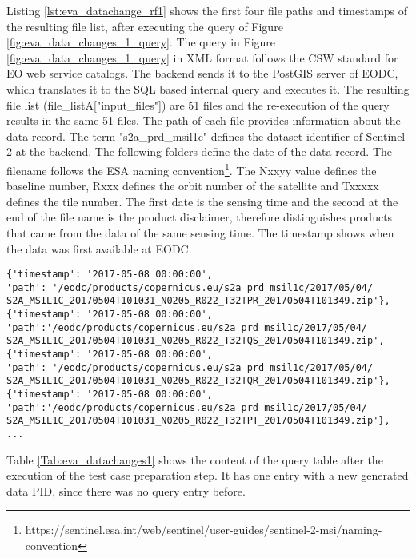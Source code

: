 \documentclass[draft,final]{vutinfth} %
\newenvironment{code}{\captionsetup{type=listing}}{}
\newcommand{\bgoesswein}[1]{{\color{blue}#1}}
\begin{document}
\begin{enumerate}
	Listing \ref{lst:eva_datachange_rf1} shows the first four file paths and timestamps of the resulting file list, after executing the query of Figure \ref{fig:eva_data_changes_1_query}. \bgoesswein{The query in Figure \ref{fig:eva_data_changes_1_query} in XML format follows the CSW standard for EO web service catalogs. The backend sends it to the PostGIS server of EODC, which translates it to the SQL based internal query and executes it.} The resulting file list (file\_listA["input\_files"]) are 51 files and the re-execution of the query results in the same 51 files. The path of each file provides information about the data record. The term "s2a\_prd\_msil1c" defines the dataset identifier of Sentinel 2 at the backend. The following folders define the date of the data record. The filename follows the ESA naming convention\footnote{https://sentinel.esa.int/web/sentinel/user-guides/sentinel-2-msi/naming-convention}. The Nxxyy value defines the baseline number, Rxxx defines the orbit number of the satellite and Txxxxx defines the tile number. The first date is the sensing time and the second at the end of the file name is the product disclaimer, therefore distinguishes products that came from the data of the same sensing time. The timestamp shows when the data was first available at EODC.
	\newpage
	\begin{code}
		\begin{verbatim}
{'timestamp': '2017-05-08 00:00:00', 
'path': '/eodc/products/copernicus.eu/s2a_prd_msil1c/2017/05/04/
S2A_MSIL1C_20170504T101031_N0205_R022_T32TPR_20170504T101349.zip'}, 
{'timestamp': '2017-05-08 00:00:00',
'path':'/eodc/products/copernicus.eu/s2a_prd_msil1c/2017/05/04/
S2A_MSIL1C_20170504T101031_N0205_R022_T32TQS_20170504T101349.zip', 
{'timestamp': '2017-05-08 00:00:00', 
'path': '/eodc/products/copernicus.eu/s2a_prd_msil1c/2017/05/04/
S2A_MSIL1C_20170504T101031_N0205_R022_T32TQR_20170504T101349.zip'}, 
{'timestamp': '2017-05-08 00:00:00',
'path':'/eodc/products/copernicus.eu/s2a_prd_msil1c/2017/05/04/
S2A_MSIL1C_20170504T101031_N0205_R022_T32TPT_20170504T101349.zip'},
...
		\end{verbatim}
		\caption{First four resulting files with creation timestamp.}
		\label{lst:eva_datachange_rf1}
	\end{code}
	
	Table \ref{Tab:eva_datachanges1} shows the content of the query table after the execution of the test case preparation step. It has one entry with a new generated data PID, since there was no query entry before.
	

\end{enumerate}
\end{document}
